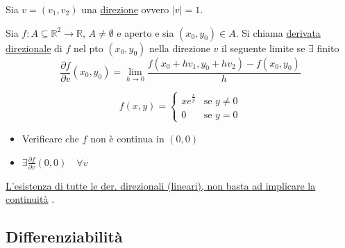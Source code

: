 \begin{definition}
Sia $v = (v_1, v_2)$ una \underline{direzione} ovvero $\vert v \vert = 1$.

Sia $f : A \subseteq \mathbb{R}^2 \to \mathbb{R}$, $A \neq \emptyset$ e aperto e sia $(x_0, y_0) \in A$. Si chiama \underline{derivata direzionale} di $f$ nel pto $(x_0, y_0)$ nella direzione $v$ il seguente limite se $\exists$ finito
\[
\frac{\partial f}{\partial v}(x_0, y_0) = \lim_{h \to 0} \frac{f(x_0 + h v_1, y_0 + h v_2) - f(x_0, y_0)}{h}
\]
\end{definition}

\begin{example}
\[
f(x, y) = \begin{cases}
x e^{\frac{x}{y}} & \text{se } y \neq 0 \\
0 & \text{se } y = 0
\end{cases}
\]
\begin{itemize}
    \item Verificare che $f$ non è continua in $(0, 0)$
    \item $\exists \frac{\partial f}{\partial v}(0, 0) \quad \forall v$
\end{itemize}
\end{example}

\begin{oss}
\underline{L'esistenza di tutte le der. direzionali (lineari), non basta ad implicare la continuità} .
\end{oss}

\subsection{Differenziabilità}

